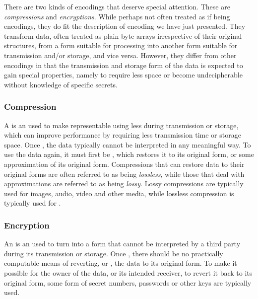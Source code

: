 There are two kinds of encodings that deserve special attention.
These are \textit{compressions} and \textit{encryptions}.
While perhaps not often treated as if being encodings, they do fit the description of encoding we have just presented.
They transform data, often treated as plain byte arrays irrespective of their original structures, from a form suitable for processing into another form suitable for transmission and/or storage, and vice versa.
However, they differ from other encodings in that the transmission and storage form of the data is expected to gain special properties, namely to require less space or become undecipherable without knowledge of specific secrets.

\subsubsection{Compression}
\label{sec:concepts:encoding:compression}

A  is an  used to make  representable using less  during transmission or storage, which can improve performance by requiring less transmission time or storage space.
Once , the data typically cannot be interpreted in any meaningful way.
To use the data again, it must first be , which restores it to its original form, or some approximation of its original form.
Compressions that can restore data to their original forms are often referred to as being \textit{lossless}, while those that deal with approximations are referred to as being \textit{lossy}.
Lossy compressions are typically used for images, audio, video and other media, while lossless compression is typically used for .

\subsubsection{Encryption}
\label{sec:concepts:encoding:encryption}

An  is an  used to turn  into a form that cannot be interpreted by a third party during its transmission or storage.
Once , there should be no practically computable means of reverting, or , the data to its original form.
To make it possible for the owner of the data, or its intended receiver, to revert it back to its original form, some form of secret numbers, passwords or other keys are typically used.

